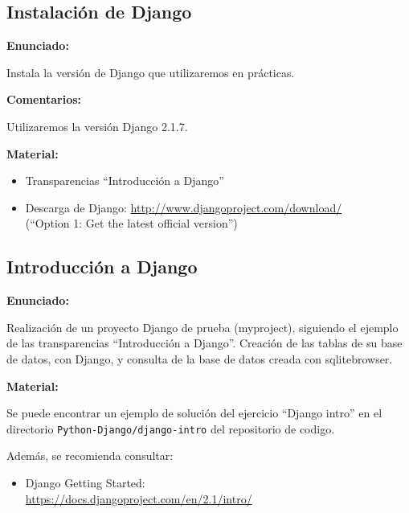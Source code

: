 \subsection{Instalación de Django}
\label{subsec:django-install}

\textbf{Enunciado:}

Instala la versión de Django que utilizaremos en prácticas.

\textbf{Comentarios:}

Utilizaremos la versión Django 2.1.7.

\textbf{Material:}

\begin{itemize}
\item Transparencias ``Introducción a Django''
\item Descarga de Django: \url{http://www.djangoproject.com/download/} \\
  (``Option 1: Get the latest official version'')
\end{itemize}


\subsection{Introducción a Django}
\label{subsec:django-intro}

\textbf{Enunciado:}

Realización de un proyecto Django de prueba (myproject), siguiendo el ejemplo de las transparencias ``Introducción a Django''. Creación de las tablas de su base de datos, con Django, y consulta de la base de datos creada con sqlitebrowser.

\textbf{Material:}

Se puede encontrar un ejemplo de solución del ejercicio ``Django intro'' en el directorio \verb|Python-Django/django-intro| del repositorio de codigo.

Además, se recomienda consultar:

\begin{itemize}
\item Django Getting Started: \\
  \url{https://docs.djangoproject.com/en/2.1/intro/}
\end{itemize}

